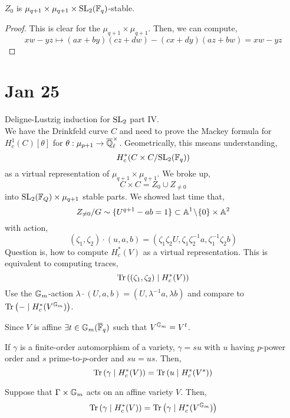 \documentclass[12pt]{article}
\begin{document}
\begin{lemma}
$Z_0$ is $\mu_{q+1} \times \mu_{q+1} \times \mathrm{SL}_2(\mathbb{F}_q)$-stable. 
\end{lemma}

\begin{proof}
This is clear for the $\mu_{q+1} \times \mu_{q+1}$. Then, we can compute,
\[ xw - yz \mapsto (ax + by)(cz + dw) - (cx + dy)(az + bw) = xw - yz \]
\end{proof}

\section{Jan 25}

Deligne-Lustzig induction for $\mathrm{SL}_2$ part IV.
\bigskip\\
We have the Drinkfeld curve $C$ and need to prove the Mackey formula for $H^1_c(C)[\theta]$ for $\theta : \mu_{p+1} \to \overline{\mathbb{Q}}_\ell^\times$. Geometrically, this mseans understanding,
\[ H^*_c(C \times C / \mathrm{SL}_2(\mathbb{F}_q)) \]
as a virtual representation of $\mu_{q+1} \times \mu_{q+1}$. We broke up,
\[ C \times C = Z_0 \cup Z_{\neq 0} \]
into $\mathrm{SL}_2(\mathbb{F}_Q) \times \mu_{q+1}$ stable parts. We showed last time that,
\[ Z_{\neq 0} / G \sim \{ U^{q+1} - ab = 1 \} \subset \mathbb{A}^1 \! \setminus \! \{ 0 \} \times \mathbb{A}^2 \] 
with action,
\[ (\zeta_1, \zeta_2) \cdot (u, a, b) = (\zeta_1 \zeta_2 U, \zeta_1 \zeta_2^{-1} a, \zeta_1^{-1} \zeta_2 b) \]
Question is, how to compute $H^*_c(V)$ as a virtual representation. This is equivalent to computing traces,
\[ \mathrm{Tr}\left( (\zeta_1, \zeta_2) \mid H^*_c(V) \right) \]
Use the ${\mathbb{G}_m}$-action $\lambda \cdot (U, a, b) = (U, \lambda^{-1} a, \lambda b)$ and compare to $\mathrm{Tr}\left( -  \mid H^*_c(V^{\mathbb{G}_m}) \right)$.

\begin{prop}
Since $V$ is affine $\exists t \in {\mathbb{G}_m}(\overline{\mathbb{F}}_q)$ such that $V^{\mathbb{G}_m} = V^t$.
\end{prop}

\begin{prop}
If $\gamma$ is a finite-order automorphism of a variety, $\gamma = s u$ with $u$ having $p$-power order and $s$ prime-to-$p$-order and $su = us$. Then,
\[ \mathrm{Tr}\left( \gamma \mid H^*_c(V) \right) = \mathrm{Tr}\left( u \mid H^*_c(V^s) \right) \]
\end{prop}

\begin{lemma}
Suppose that $\Gamma \times {\mathbb{G}_m}$ acts on an affine variety $V$. Then,
\[ \mathrm{Tr}\left( \gamma \mid H^*_c(V) \right) = \mathrm{Tr}\left( \gamma \mid H^*_c(V^{\mathbb{G}_m}) \right) \]
\end{lemma}
\end{document}
